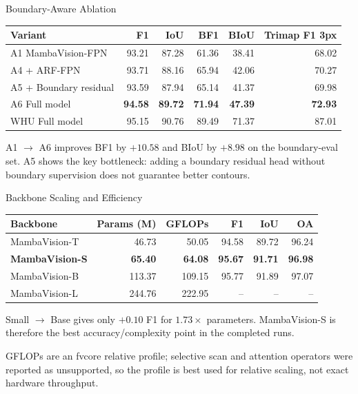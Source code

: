 \begin{frame}{Boundary-Aware Ablation}
    \centering
    \scriptsize
    \begin{tabular}{lrrrrr}
        \toprule
        \textbf{Variant} & \textbf{F1} & \textbf{IoU} & \textbf{BF1} & \textbf{BIoU} & \textbf{Trimap F1 3px} \\
        \midrule
        A1 MambaVision-FPN & 93.21 & 87.28 & 61.36 & 38.41 & 68.02 \\
        A4 + ARF-FPN & 93.71 & 88.16 & 65.94 & 42.06 & 70.27 \\
        A5 + Boundary residual & 93.59 & 87.94 & 65.14 & 41.37 & 69.98 \\
        A6 Full model & \textbf{94.58} & \textbf{89.72} & \textbf{71.94} & \textbf{47.39} & \textbf{72.93} \\
        WHU Full model & 95.15 & 90.76 & 89.49 & 71.37 & 87.01 \\
        \bottomrule
    \end{tabular}

    \vspace{0.7em}
    \small
    A1 \(\rightarrow\) A6 improves BF1 by \(+10.58\) and BIoU by \(+8.98\) on the boundary-eval set.
    A5 shows the key bottleneck: adding a boundary residual head without boundary supervision does not guarantee better contours.
\end{frame}

\begin{frame}{Backbone Scaling and Efficiency}
    \centering
    \scriptsize
    \begin{tabular}{lrrrrr}
        \toprule
        \textbf{Backbone} & \textbf{Params (M)} & \textbf{GFLOPs} & \textbf{F1} & \textbf{IoU} & \textbf{OA} \\
        \midrule
        MambaVision-T & 46.73 & 50.05 & 94.58 & 89.72 & 96.24 \\
        \textbf{MambaVision-S} & \textbf{65.40} & \textbf{64.08} & \textbf{95.67} & \textbf{91.71} & \textbf{96.98} \\
        MambaVision-B & 113.37 & 109.15 & 95.77 & 91.89 & 97.07 \\
        MambaVision-L & 244.76 & 222.95 & -- & -- & -- \\
        \bottomrule
    \end{tabular}

    \vspace{0.8em}
    \small
    Small \(\rightarrow\) Base gives only \(+0.10\) F1 for \(1.73\times\) parameters.
    MambaVision-S is therefore the best accuracy/complexity point in the completed runs.

    \vspace{0.3em}
    \scriptsize
    GFLOPs are an fvcore relative profile; selective scan and attention operators were reported as unsupported, so the profile is best used for relative scaling, not exact hardware throughput.
\end{frame}

